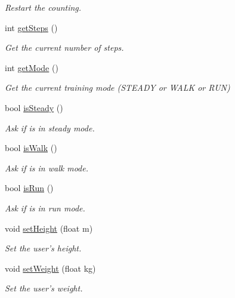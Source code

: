 \begin{DoxyCompactItemize}
\begin{DoxyCompactList}\small\item\em Restart the counting. \end{DoxyCompactList}\item 
int \hyperlink{class_pedometer_a4d48e84820e8c2448d5147d1c7e2693a}{get\-Steps} ()
\begin{DoxyCompactList}\small\item\em Get the current number of steps. \end{DoxyCompactList}\item 
int \hyperlink{class_pedometer_a854089e4420736acb78b25d9ca037084}{get\-Mode} ()
\begin{DoxyCompactList}\small\item\em Get the current training mode (S\-T\-E\-A\-D\-Y or W\-A\-L\-K or R\-U\-N) \end{DoxyCompactList}\item 
bool \hyperlink{class_pedometer_ab1a681e46f1f0a157cf5cf2ebff5b609}{is\-Steady} ()
\begin{DoxyCompactList}\small\item\em Ask if is in steady mode. \end{DoxyCompactList}\item 
bool \hyperlink{class_pedometer_a1944eba109a4f2cd9d9948c0677627df}{is\-Walk} ()
\begin{DoxyCompactList}\small\item\em Ask if is in walk mode. \end{DoxyCompactList}\item 
bool \hyperlink{class_pedometer_ab2cadd5ca49b6e3ce1f844603fcf3a08}{is\-Run} ()
\begin{DoxyCompactList}\small\item\em Ask if is in run mode. \end{DoxyCompactList}\item 
void \hyperlink{class_pedometer_a0f2085c2686f6acd824411a3cd75132f}{set\-Height} (float m)
\begin{DoxyCompactList}\small\item\em Set the user's height. \end{DoxyCompactList}\item 
void \hyperlink{class_pedometer_a25dd27f55bf919dcd7e7db0fa2b0aa1f}{set\-Weight} (float kg)
\begin{DoxyCompactList}\small\item\em Set the user's weight. \end{DoxyCompactList}\item 

\end{DoxyCompactItemize}
